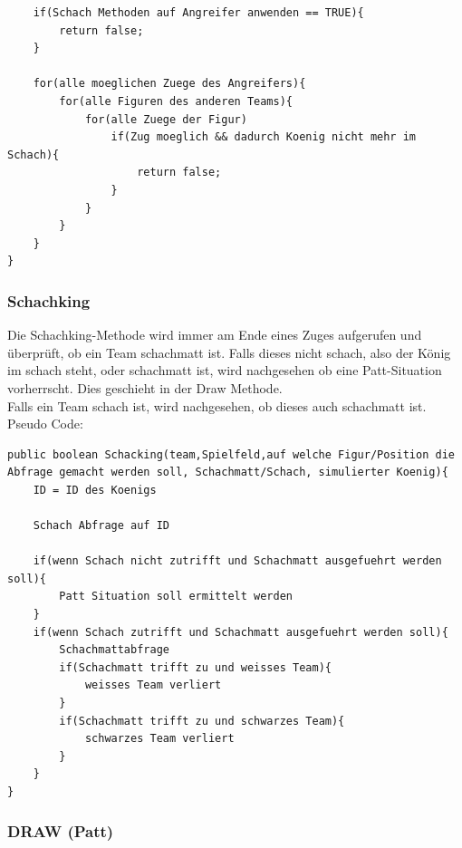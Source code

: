 \documentclass[12pt,a4paper]{article}
\begin{document}
{\begin{lstlisting}
	if(Schach Methoden auf Angreifer anwenden == TRUE){
		return false;
	}
	
	for(alle moeglichen Zuege des Angreifers){
		for(alle Figuren des anderen Teams){
			for(alle Zuege der Figur)
				if(Zug moeglich && dadurch Koenig nicht mehr im Schach){
					return false;
				}
			}			
		}
	}
}
\end{lstlisting}


\subsubsection{Schachking}
\label{SUBSUBSEC:checkking}

Die Schachking-Methode wird immer am Ende eines Zuges aufgerufen und überprüft, ob ein Team schachmatt ist. Falls dieses nicht schach, also der König im schach steht, oder schachmatt ist, wird nachgesehen ob eine Patt-Situation vorherrscht. Dies geschieht in der Draw Methode. \\
Falls ein Team schach ist, wird nachgesehen, ob dieses auch schachmatt ist. \\
Pseudo Code:

\lstset{language=Java}
\begin{lstlisting}
public boolean Schacking(team,Spielfeld,auf welche Figur/Position die Abfrage gemacht werden soll, Schachmatt/Schach, simulierter Koenig){
	ID = ID des Koenigs
	
	Schach Abfrage auf ID
	
	if(wenn Schach nicht zutrifft und Schachmatt ausgefuehrt werden soll){
		Patt Situation soll ermittelt werden
	}
	if(wenn Schach zutrifft und Schachmatt ausgefuehrt werden soll){
		Schachmattabfrage
		if(Schachmatt trifft zu und weisses Team){
			weisses Team verliert
		}	
		if(Schachmatt trifft zu und schwarzes Team){
			schwarzes Team verliert
		}
	}
}
\end{lstlisting}

\subsubsection{DRAW (Patt)}
\label{SUBSUBSEC:draw}

}
\end{document}
